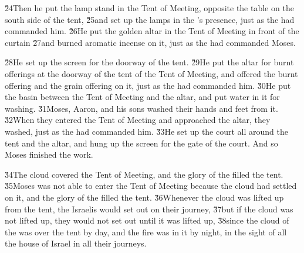 \v{24}Then he put the lamp stand in the Tent of Meeting, opposite the table on the south side of the tent, \v{25}and set up the lamps in the 's presence, just as the  had commanded him. \v{26}He put the golden altar in the Tent of Meeting in front of the curtain \v{27}and burned aromatic incense on it, just as the  had commanded Moses.

\v{28}He set up the screen for the doorway of the tent. \v{29}He put the altar for burnt offerings at the doorway of the tent of the Tent of Meeting, and offered the burnt offering and the grain offering on it, just as the  had commanded him. \v{30}He put the basin between the Tent of Meeting and the altar, and put water in it for washing. \v{31}Moses, Aaron, and his sons washed their hands and feet from it. \v{32}When they entered the Tent of Meeting and approached the altar, they washed, just as the  had commanded him. \v{33}He set up the court all around the tent and the altar, and hung up the screen for the gate of the court. And so Moses finished the work.

\v{34}The cloud covered the Tent of Meeting, and the glory of the  filled the tent. \v{35}Moses was not able to enter the Tent of Meeting because the cloud had settled on it, and the glory of the  filled the tent. \v{36}Whenever the cloud was lifted up from the tent, the Israelis would set out on their journey, \v{37}but if the cloud was not lifted up, they would not set out until it was lifted up, \v{38}since the cloud of the  was over the tent by day, and the fire was in it by night, in the sight of all the house of Israel in all their journeys.
